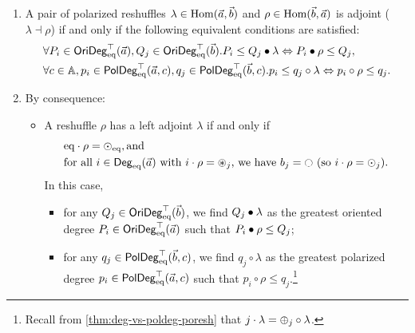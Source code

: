 \documentclass[a4paper]{memoir}
\begin{document}
\begin{theorem}\label{thm:poresh-adjoint}
	\begin{enumerate}
		\item A pair of polarized reshuffles $\lambda \in {\mathrm{Hom}}(\vec a, \vec b)$ and $\rho \in {\mathrm{Hom}}(\vec b, \vec a)$ is adjoint ($\lambda \dashv \rho$) if and only if the following equivalent conditions are satisfied:
		\begin{align}
			&\forall P_i \in \mathsf{OriDeg}_{\mathrm{eq}}^\top(\vec a), Q_j \in \mathsf{OriDeg}_{\mathrm{eq}}^\top(\vec b). P_i \leq Q_j \mathbin{\bullet} \lambda \Leftrightarrow P_i \mathbin{\bullet} \rho \leq Q_j,
			\label{eq:poresh-adjoint-crit-orideg}
			\\
			&\forall c \in {\mathbb{A}}, p_i \in \mathsf{PolDeg}_{\mathrm{eq}}^\top(\vec a, c), q_j \in \mathsf{PolDeg}_{\mathrm{eq}}^\top(\vec b, c). p_i \leq q_j \circ \lambda \Leftrightarrow p_i \circ \rho \leq q_j.
			\label{eq:poresh-adjoint-crit-poldeg}
		\end{align}
		\item By consequence:
		\begin{itemize}
			\item A reshuffle $\rho$ has a left adjoint $\lambda$ if and only if
			\begin{align}
				&\eqtydeg \cdot \rho = \nonpol_\eqtydeg, \text{and} \label{eq:poresh-withl-crit1} \\
				&\text{for all } i \in \Degeq(\vec a) \text{ with } i \cdot \rho = \isopol_j \text{, we have } b_j = \npolar \text{ (so $i \cdot \rho = \nonpol_j$)}. \label{eq:poresh-withl-crit2}
			\end{align}
			In this case,
			\begin{itemize}
				\item for any $Q_j \in \mathsf{OriDeg}_{\mathrm{eq}}^\top(\vec b)$, we find $Q_j \mathbin{\bullet} \lambda$ as the greatest oriented degree $P_i \in \mathsf{OriDeg}_{\mathrm{eq}}^\top(\vec a)$ such that $P_i \mathbin{\bullet} \rho \leq Q_j$;
				\item for any $q_j \in \mathsf{PolDeg}_{\mathrm{eq}}^\top(\vec b, c)$, we find $q_j \circ \lambda$ as the greatest polarized degree $p_i \in \mathsf{PolDeg}_{\mathrm{eq}}^\top(\vec a, c)$ such that $p_i \circ \rho \leq q_j$.\footnote{Recall from \cref{thm:deg-vs-poldeg-poresh} that $j \cdot \lambda = {\oplus}_j \circ \lambda$.}
			\end{itemize}
			

\end{itemize}
\end{enumerate}
\end{theorem}
\end{document}
